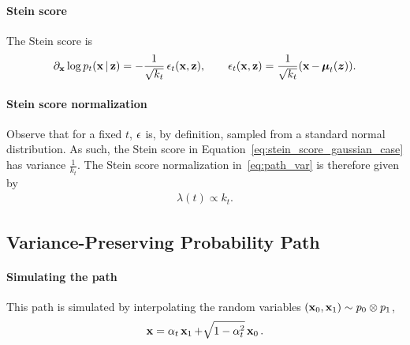 \paragraph{Stein score}
The Stein score is \citep{kingma2023diffusion}
\begin{align}
    \label{eq:stein_score_gaussian_case}
    \partial_{\operatorname{\mathbf{x}}} \log p_t(\operatorname{\mathbf{x}} | \operatorname{\mathbf{z}})
    =
    -\frac{1}{\sqrt{k_t}}
    \operatorname{\mathbf{\epsilon}}_t(\operatorname{\mathbf{x}}, \operatorname{\mathbf{z}})
    , \qquad
    \operatorname{\mathbf{\epsilon}}_t(\operatorname{\mathbf{x}}, \operatorname{\mathbf{z}}) = \frac{1}{\sqrt{k_t}} (\operatorname{\mathbf{x}} - \operatorname{\bm{\mu}}_t({\bm{z}})).
\end{align}

\paragraph{Stein score normalization}

Observe that for a fixed $t$, $\operatorname{\mathbf{\epsilon}}$ is, by definition, sampled from a standard normal distribution. As such, the Stein score in Equation~\eqref{eq:stein_score_gaussian_case} has variance $\frac{1}{k_{t}}$. The Stein score normalization in~\eqref{eq:path_var} is therefore given by
\begin{align}
     \lambda(t) 
     \propto 
     k_{t}.
\end{align}



\subsection{Variance-Preserving Probability Path}
\label{app:ssec:vp_path}

\paragraph{Simulating the path}
This path is simulated by interpolating the random variables $(\operatorname{\mathbf{x}}_0, \operatorname{\mathbf{x}}_1) \sim p_0 \otimes p_1$,
\begin{align}
    \operatorname{\mathbf{x}}
    = 
    \alpha_{t} \operatorname{\mathbf{x}}_1 
    +
    \sqrt{1 - \alpha_t^2} \operatorname{\mathbf{x}}_0.
\end{align}

